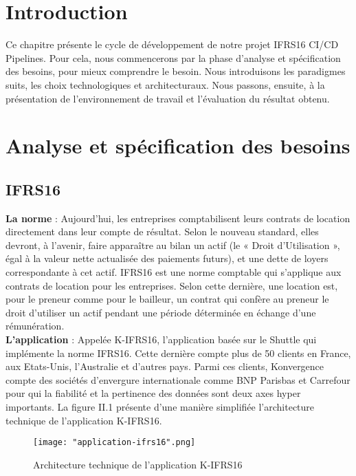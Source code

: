 \begin{spacing}{1.2}
\section*{Introduction}
Ce chapitre présente le cycle de développement de notre projet IFRS16 CI/CD Pipelines. Pour cela, nous commencerons par la phase d’analyse et spécification des besoins, pour mieux comprendre le besoin. Nous introduisons les paradigmes suits, les choix technologiques et architecturaux. Nous passons, ensuite, à la présentation de l’environnement de travail et l’évaluation du résultat obtenu.
\section{Analyse et spécification des besoins}
\subsection{IFRS16}
\textbf{La norme} :
Aujourd’hui, les entreprises comptabilisent leurs contrats de location directement dans leur compte de résultat. Selon le nouveau standard, elles devront, à l’avenir, faire apparaître au bilan un actif (le « Droit d’Utilisation », égal à la valeur nette actualisée des paiements futurs), et une dette de loyers correspondante à cet actif. 
IFRS16 est une norme comptable qui s'applique aux contrats de location pour les entreprises. Selon cette dernière, une location est, pour le preneur comme pour le bailleur, un contrat qui confère au preneur le droit d’utiliser un actif pendant une période déterminée en échange d’une rémunération\cite{ifrs16}. \\

\textbf{L'application} :
Appelée K-IFRS16, l'application basée sur le Shuttle qui implémente la norme IFRS16. Cette dernière compte plus de 50 clients en France, aux Etats-Unis, l'Australie et d'autres pays. 
Parmi ces clients, Konvergence compte des sociétés d'envergure internationale comme BNP Parisbas et Carrefour pour qui la fiabilité et la pertinence des données sont deux axes hyper importants. 
La figure II.1 présente d'une manière simplifiée l'architecture technique de l'application K-IFRS16\cite{intern}. \\
\begin{figure}[!ht]\centering
\texttt{[image: "application-ifrs16".png]}
\caption{Architecture technique de l'application K-IFRS16}
\label{fig:fig1}
\end{figure}


\end{spacing}
